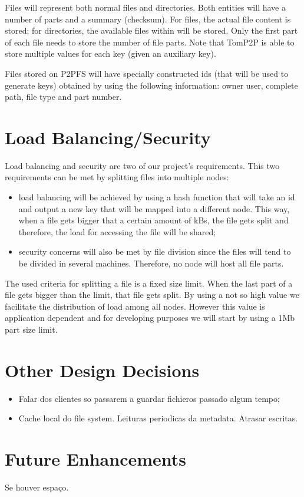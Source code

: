 \documentclass[times,9pt,article]{llncs}
\begin{document}
Files will represent both normal files and directories. Both entities will have 
a number of parts and a summary (checksum). For files, the actual file content
is stored; for directories, the available files within will be stored. Only the
first part of each file needs to store the number of file parts. Note that 
TomP2P is able to store multiple values for each key (given an auxiliary key).   

Files stored on P2PFS will have specially constructed ids (that will be used to
generate keys) obtained by using the following information: owner user, complete 
path, file type and part number.

\section{Load Balancing/Security}

Load balancing and security are two of our project's requirements. This two 
requirements can be met by splitting files into multiple nodes:
\begin{itemize}
\item load balancing will be achieved by using a hash function that will take
an id and output a new key that will be mapped into a different node. This way,
when a file gets bigger that a certain amount of kBs, the file gets split and
therefore, the load for accessing the file will be shared;
\item security concerns will also be met by file division since the files will
tend to be divided in several machines. Therefore, no node will host all file
parts.
\end{itemize} 

The used criteria for splitting a file is a fixed size limit. When the last part
of a file gets bigger than the limit, that file gets split. By using a not so high
value we facilitate the distribution of load among all nodes. However this value
is application dependent and for developing purposes we will start by using a
1Mb part size limit.   

\section{Other Design Decisions}
\begin{itemize}
\item Falar dos clientes so passarem a guardar fichieros passado algum tempo;
\item Cache local do file system. Leituras periodicas da metadata. Atrasar escritas.
\end{itemize}

\section{Future Enhancements}
Se houver espaço.
\end{document}
